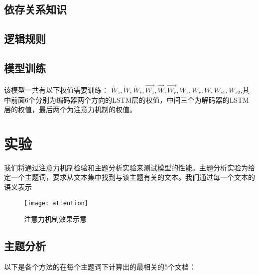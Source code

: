 \documentclass[UTF8,11pt,a4paper,nofonts]{ctexart}
\begin{document}
\subsection{依存关系知识}


\subsection{逻辑规则}



\subsection{模型训练}

该模型一共有以下权值需要训练：
$\overleftarrow{W_z}, \overleftarrow{W}, \overleftarrow{W_r}, \overrightarrow{W_z}, \overrightarrow{W}, \overrightarrow{W_r},W_z, W_r, W, W_{s1}, W_{s2}$,其中前面6个分别为编码器两个方向的LSTM层的权值，中间三个为解码器的LSTM层的权值，最后两个为注意力机制的权值。



\section{实验}

我们将通过注意力机制检验和主题分析实验来测试模型的性能。主题分析实验为给定一个主题词，要求从文本集中找到与该主题有关的文本。我们通过每一个文本的语义表示


\begin{figure}
\centering
\texttt{[image: attention]}
\caption{注意力机制效果示意}\label{fig:02}
\end{figure} 



\subsection{主题分析}


以下是各个方法的在每个主题词下计算出的最相关的5个文档：
\end{document}
